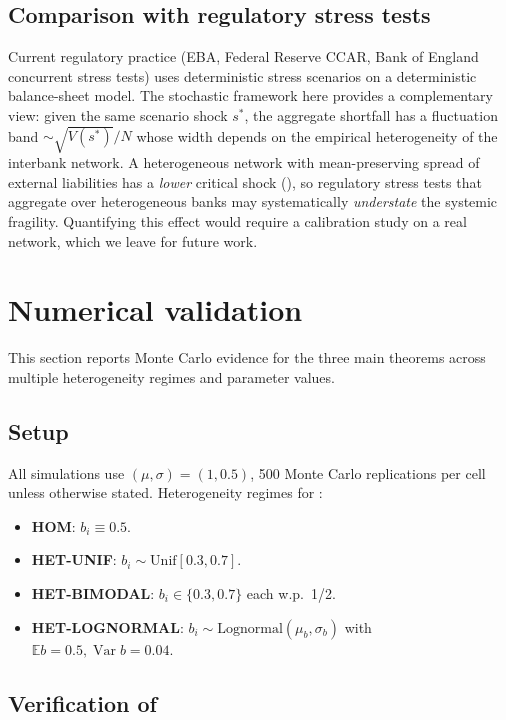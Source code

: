 \documentclass[11pt,a4paper]{article}
\theoremstyle{definition}
\DeclareMathOperator{\Var}{Var}
\begin{document}
\subsection{Comparison with regulatory stress tests}

Current regulatory practice (EBA, Federal Reserve CCAR, Bank of England
concurrent stress tests) uses deterministic stress scenarios on a
deterministic balance-sheet model. The stochastic framework here provides
a complementary view: given the same scenario shock $s^\ast$, the aggregate
shortfall has a fluctuation band $\sim\sqrt{V(s^\ast)}/N$ whose width depends
on the empirical heterogeneity of the interbank network. A heterogeneous
network with mean-preserving spread of external liabilities has a
\emph{lower} critical shock (), so regulatory stress tests
that aggregate over heterogeneous banks may systematically \emph{understate}
the systemic fragility. Quantifying this effect would require a calibration
study on a real network, which we leave for future work.

\section{Numerical validation}
\label{sec:numerical}

This section reports Monte Carlo evidence for the three main theorems
across multiple heterogeneity regimes and parameter values.

\subsection{Setup}

All simulations use $(\mu,\sigma) = (1,0.5)$, 500 Monte Carlo replications
per cell unless otherwise stated. Heterogeneity regimes for
:

\begin{itemize}[leftmargin=1.5em]
\item \textbf{HOM}: $b_i\equiv 0.5$.
\item \textbf{HET-UNIF}: $b_i\sim\mathrm{Unif}[0.3,0.7]$.
\item \textbf{HET-BIMODAL}: $b_i\in\{0.3,0.7\}$ each w.p.\ 1/2.
\item \textbf{HET-LOGNORMAL}: $b_i\sim\mathrm{Lognormal}(\mu_b,\sigma_b)$ with
   $\mathbb E b = 0.5,\Var b = 0.04$.
\end{itemize}

\subsection{Verification of }
\end{document}
